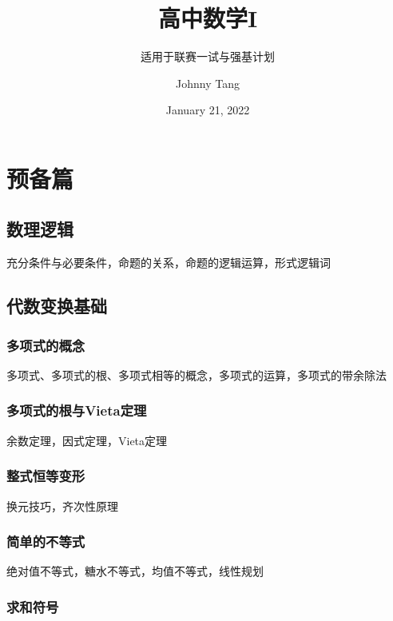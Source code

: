 \documentclass[lang=cn, zihao=4.5]{elegantbook}
\title{高中数学I}
\subtitle{适用于联赛一试与强基计划}
\author{Johnny Tang}
\institute{DEEP Team}
\date{January 21, 2022}
\begin{document}
\maketitle

\frontmatter

\mainmatter

\tableofcontents

\newpage

\part{预备篇}

\setcounter{chapter}{-1}
\chapter{数理逻辑}

充分条件与必要条件，命题的关系，命题的逻辑运算，形式逻辑词

\chapter{代数变换基础}

\section{多项式的概念}

多项式、多项式的根、多项式相等的概念，多项式的运算，多项式的带余除法

\section{多项式的根与Vieta定理}

余数定理，因式定理，Vieta定理

\section{整式恒等变形}

换元技巧，齐次性原理

\section{简单的不等式}

绝对值不等式，糖水不等式，均值不等式，线性规划

\section{求和符号}
\end{document}
